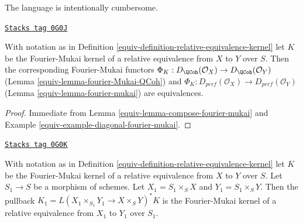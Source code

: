The language is intentionally cumbersome.

\begin{lemma}
\label{equiv-lemma-equivalences-rek}
\href{https://stacks.math.columbia.edu/tag/0G0J}{\texttt{Stacks tag 0G0J}}

With notation as in Definition \ref{equiv-definition-relative-equivalence-kernel}
let $K$ be the Fourier-Mukai kernel of a relative equivalence from $X$
to $Y$ over $S$. Then the corresponding Fourier-Mukai functors
$\Phi_K : D_\QCoh(\mathcal{O}_X) \to D_\QCoh(\mathcal{O}_Y)$
(Lemma \ref{equiv-lemma-fourier-Mukai-QCoh})
and $\Phi_K : D_{perf}(\mathcal{O}_X) \to D_{perf}(\mathcal{O}_Y)$
(Lemma \ref{equiv-lemma-fourier-mukai})
are equivalences.
\end{lemma}

\begin{proof}

Immediate from Lemma \ref{equiv-lemma-compose-fourier-mukai} and
Example \ref{equiv-example-diagonal-fourier-mukai}.
\end{proof}

\begin{lemma}
\label{equiv-lemma-base-change-rek}
\href{https://stacks.math.columbia.edu/tag/0G0K}{\texttt{Stacks tag 0G0K}}

With notation as in Definition \ref{equiv-definition-relative-equivalence-kernel}
let $K$ be the Fourier-Mukai kernel of a relative equivalence from $X$
to $Y$ over $S$. Let $S_1 \to S$ be a morphism of schemes. Let
$X_1 = S_1 \times_S X$ and $Y_1 = S_1 \times_S Y$. Then the pullback
$K_1 = L(X_1 \times_{S_1} Y_1 \to X \times_S Y)^*K$ is
the Fourier-Mukai kernel of a relative equivalence from $X_1$
to $Y_1$ over $S_1$.
\end{lemma}


